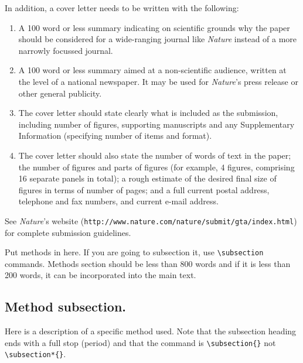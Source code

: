 \documentclass{nature}
\begin{document}
In addition, a cover letter needs to be written with the
following:
\begin{enumerate}
 \item A 100 word or less summary indicating on scientific grounds
why the paper should be considered for a wide-ranging journal like
\textsl{Nature} instead of a more narrowly focussed journal.
 \item A 100 word or less summary aimed at a non-scientific audience,
written at the level of a national newspaper.  It may be used for
\textsl{Nature}'s press release or other general publicity.
 \item The cover letter should state clearly what is included as the
submission, including number of figures, supporting manuscripts
and any Supplementary Information (specifying number of items and
format).
 \item The cover letter should also state the number of
words of text in the paper; the number of figures and parts of
figures (for example, 4 figures, comprising 16 separate panels in
total); a rough estimate of the desired final size of figures in
terms of number of pages; and a full current postal address,
telephone and fax numbers, and current e-mail address.
\end{enumerate}

See \textsl{Nature}'s website
(\texttt{http://www.nature.com/nature/submit/gta/index.html}) for
complete submission guidelines.

\begin{methods}
Put methods in here.  If you are going to subsection it, use
\verb|\subsection| commands.  Methods section should be less than
800 words and if it is less than 200 words, it can be incorporated
into the main text.

\subsection{Method subsection.}

Here is a description of a specific method used.  Note that the
subsection heading ends with a full stop (period) and that the
command is \verb|\subsection{}| not \verb|\subsection*{}|.

\end{methods}
\end{document}
